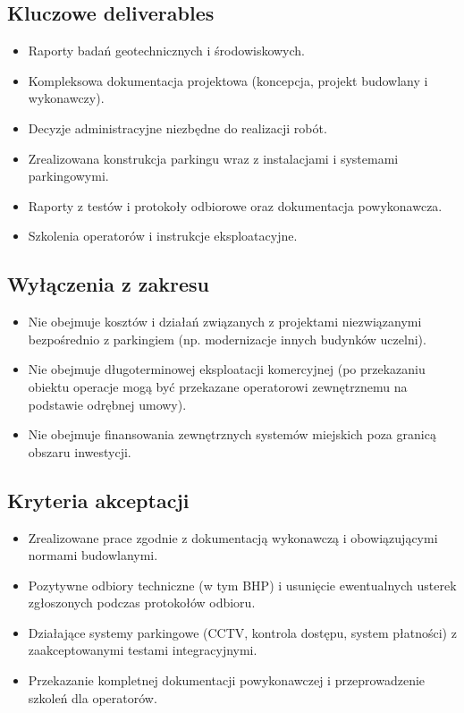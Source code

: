 \documentclass[a4paper,12pt]{article}
\begin{document}
\subsection*{Kluczowe deliverables}
\begin{itemize}
    \item Raporty badań geotechnicznych i środowiskowych.
    \item Kompleksowa dokumentacja projektowa (koncepcja, projekt budowlany i wykonawczy).
    \item Decyzje administracyjne niezbędne do realizacji robót.
    \item Zrealizowana konstrukcja parkingu wraz z instalacjami i systemami parkingowymi.
    \item Raporty z testów i protokoły odbiorowe oraz dokumentacja powykonawcza.
    \item Szkolenia operatorów i instrukcje eksploatacyjne.
\end{itemize}

\subsection*{Wyłączenia z zakresu}
\begin{itemize}
    \item Nie obejmuje kosztów i działań związanych z projektami niezwiązanymi bezpośrednio z parkingiem (np. modernizacje innych budynków uczelni).
    \item Nie obejmuje długoterminowej eksploatacji komercyjnej (po przekazaniu obiektu operacje mogą być przekazane operatorowi zewnętrznemu na podstawie odrębnej umowy).
    \item Nie obejmuje finansowania zewnętrznych systemów miejskich poza granicą obszaru inwestycji.
\end{itemize}

\subsection*{Kryteria akceptacji}
\begin{itemize}
    \item Zrealizowane prace zgodnie z dokumentacją wykonawczą i obowiązującymi normami budowlanymi.
    \item Pozytywne odbiory techniczne (w tym BHP) i usunięcie ewentualnych usterek zgłoszonych podczas protokołów odbioru.
    \item Działające systemy parkingowe (CCTV, kontrola dostępu, system płatności) z zaakceptowanymi testami integracyjnymi.
    \item Przekazanie kompletnej dokumentacji powykonawczej i przeprowadzenie szkoleń dla operatorów.
\end{itemize}
\end{document}
